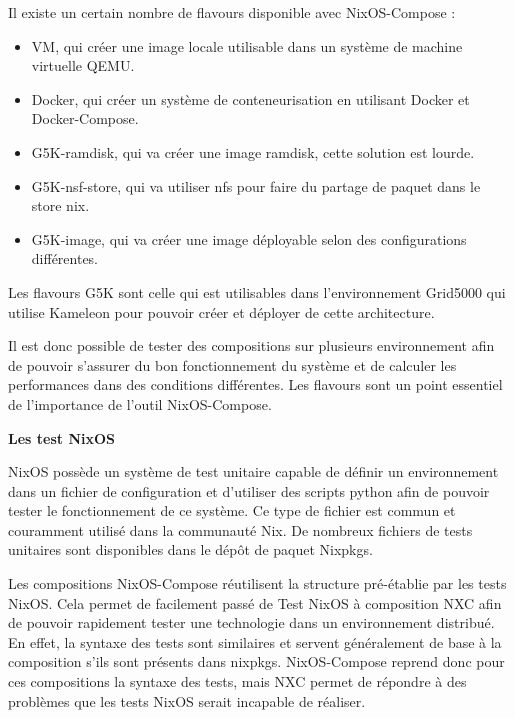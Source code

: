 \documentclass[a4paper,french,12pt, titlepage]{article}
\begin{document}
Il existe un certain nombre de flavours disponible avec NixOS-Compose
:\newline

\begin{itemize}
\item
  VM, qui créer une image locale utilisable dans un système de machine
  virtuelle QEMU.
\item
  Docker, qui créer un système de conteneurisation en utilisant Docker
  et Docker-Compose.
\item
  G5K-ramdisk, qui va créer une image ramdisk, cette solution est
  lourde.
\item
  G5K-nsf-store, qui va utiliser nfs pour faire du partage de paquet
  dans le store nix.
\item
  G5K-image, qui va créer une image déployable selon des configurations
  différentes.\newline
\end{itemize}

Les flavours G5K sont celle qui est utilisables dans l'environnement
Grid5000 qui utilise Kameleon pour pouvoir créer et déployer de cette
architecture.\newline

Il est donc possible de tester des compositions sur plusieurs
environnement afin de pouvoir s'assurer du bon fonctionnement du système
et de calculer les performances dans des conditions différentes. Les
flavours sont un point essentiel de l'importance de l'outil
NixOS-Compose.\newline

\textbf{Les test NixOS}\newline

NixOS possède un système de test unitaire capable de définir un
environnement dans un fichier de configuration et d'utiliser des scripts
python afin de pouvoir tester le fonctionnement de ce système. Ce type
de fichier est commun et couramment utilisé dans la communauté Nix. De
nombreux fichiers de tests unitaires sont disponibles dans le dépôt de
paquet Nixpkgs.\newline

Les compositions NixOS-Compose réutilisent la structure pré-établie par
les tests NixOS. Cela permet de facilement passé de Test NixOS à
composition NXC afin de pouvoir rapidement tester une technologie dans
un environnement distribué. En effet, la syntaxe des tests sont
similaires et servent généralement de base à la composition s'ils sont
présents dans nixpkgs. NixOS-Compose reprend donc pour ces compositions
la syntaxe des tests, mais NXC permet de répondre à des problèmes que
les tests NixOS serait incapable de réaliser.\newline
\end{document}
